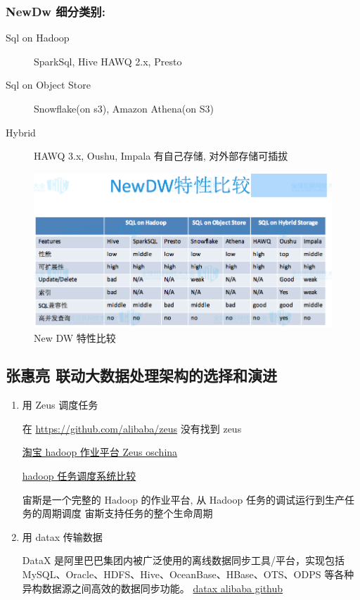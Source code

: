 \documentclass[hyperref, UTF-8]{ctexart}
\begin{document}
\subsubsection{NewDw 细分类别:}
\label{sec:org049e693}
\begin{description}
\item[{Sql on Hadoop}] SparkSql, Hive HAWQ 2.x, Presto
\item[{Sql on Object Store}] Snowflake(on s3), Amazon Athena(on S3)
\item[{Hybrid}] HAWQ 3.x, Oushu, Impala
有自己存储, 对外部存储可插拔
\end{description}

\begin{figure}[htbp]
\centering
\includegraphics[width=.9\linewidth]{PPTNote/NewDwCompare.jpg}
\caption{New DW 特性比较}
\end{figure}
\subsection{张惠亮 联动大数据处理架构的选择和演进}
\label{sec:org7c33fae}
\begin{enumerate}
\item 用 Zeus 调度任务

在 \url{https://github.com/alibaba/zeus} 没有找到 zeus

\href{https://oschina.net/p/alibaba-zeus}{淘宝 hadoop 作业平台 Zeus oschina}

\href{http://www.cnblogs.com/smartloli/p/4964741.html}{hadoop 任务调度系统比较}

宙斯是一个完整的 Hadoop 的作业平台, 从 Hadoop 任务的调试运行到生产任务的周期调度 宙斯支持任务的整个生命周期
\item 用 datax 传输数据

DataX 是阿里巴巴集团内被广泛使用的离线数据同步工具/平台，实现包括 MySQL、Oracle、HDFS、Hive、OceanBase、HBase、OTS、ODPS 等各种异构数据源之间高效的数据同步功能。
\href{https://github.com/alibaba/DataX}{datax alibaba github}
\end{enumerate}
\end{document}
